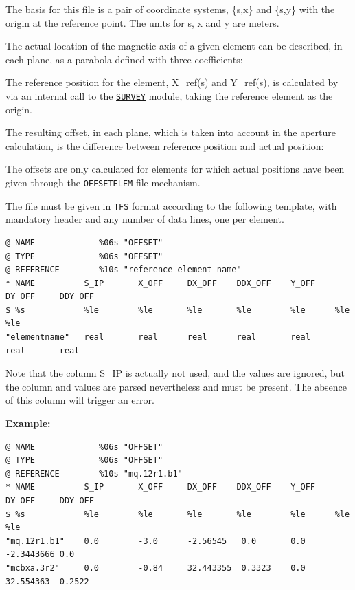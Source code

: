 The basis for this file is a pair of coordinate systems, \{s,x\} and \{s,y\} 
with the origin at the reference point. The units for s, x and y are
meters.

The actual location of the magnetic axis of a given element can be
described, in each plane, as a parabola defined with three coefficients: 

The reference position for the element, X\_ref(s) and Y\_ref(s), is
calculated  by \madx via an internal call to the
\hyperref[chap:survey]{\tt SURVEY} module, taking the reference element
as the origin.   

The resulting offset, in each plane, which is taken into account in the
aperture calculation, is the difference between reference position and
actual position:  

The offsets are only calculated for elements for which actual positions 
have been given through the {\tt OFFSETELEM} file mechanism. 

The file must be given in {\tt TFS} format according to the following
template, with mandatory header and any number of data lines, one per element. 

\begin{verbatim}
@ NAME             %06s "OFFSET" 
@ TYPE             %06s "OFFSET" 
@ REFERENCE        %10s "reference-element-name" 
* NAME          S_IP       X_OFF     DX_OFF    DDX_OFF    Y_OFF    DY_OFF     DDY_OFF
$ %s            %le        %le       %le       %le        %le      %le        %le
"elementname"	real       real      real      real       real     real       real
\end{verbatim}

Note that the column S\_IP is actually not used, and the values are ignored, 
but the column and values are parsed nevertheless and must be present. 
The absence of this column will trigger an error. 

{\bf Example:}
\begin{verbatim}
@ NAME             %06s "OFFSET" 
@ TYPE             %06s "OFFSET" 
@ REFERENCE        %10s "mq.12r1.b1" 
* NAME          S_IP       X_OFF     DX_OFF    DDX_OFF    Y_OFF    DY_OFF     DDY_OFF
$ %s            %le        %le       %le       %le        %le      %le        %le
"mq.12r1.b1"	0.0        -3.0      -2.56545   0.0       0.0      -2.3443666 0.0
"mcbxa.3r2"     0.0        -0.84     32.443355  0.3323    0.0      32.554363  0.2522
\end{verbatim}

